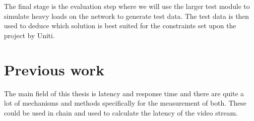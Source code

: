 \documentclass[a4paper]{article}
\begin{document}
The final stage is the evaluation step where we will use the larger test module
to simulate heavy loads on the network to generate test data. The test data is
then used to deduce which solution is best suited for the constraints set upon
the project by Uniti.







\section{Previous work}


The main field of this thesis is latency and response time and there are quite a
lot of mechanisms and methods specifically for the measurement of both. These
could be used in chain and used to calculate the latency of the video stream.
\end{document}
